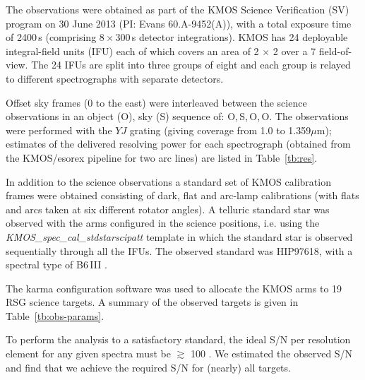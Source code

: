 \documentclass[iop]{emulateapj}
\begin{document}
The observations were obtained as part of the KMOS Science Verification (SV) program on 30 June 2013 (PI: Evans 60.A-9452(A)),
with a total exposure time of 2400\,s
(comprising 8\,$\times$\,300\,s detector integrations).
KMOS has 24 deployable integral-field units (IFU) each of which covers an area of
2 $\times$ 2 over a 7 field-of-view.
The 24 IFUs are split into three groups of eight and each group is relayed to different spectrographs with separate detectors.

Offset sky frames
(0 to the east) were interleaved between the science observations in an object (O), sky (S) sequence of:
O,\,S,\,O,\,O.
The observations were performed with the $YJ$ grating
(giving coverage from 1.0 to 1.359$\mu$m);
estimates of the delivered resolving power for each spectrograph (obtained from the KMOS/esorex pipeline for two arc lines) are listed in Table~\ref{tb:res}.

In addition to the science observations a standard set of KMOS calibration frames were obtained consisting of dark, flat and arc-lamp calibrations (with flats and arcs taken at six different rotator angles).
A telluric standard star was observed with the arms configured in the science positions, i.e. using the {\em KMOS\_spec\_cal\_stdstarscipatt} template in which the standard star is observed sequentially through all the IFUs.
The observed standard was HIP97618, with a spectral type of B6\,III
\citep{1988mcts.book.....H}.

The {\sc karma} configuration software
\citep{2008SPIE.7019E..27W} was used to allocate the KMOS arms to 19 RSG science targets.
A summary of the observed targets is given in
Table~\ref{tb:obs-params}.

To perform the analysis to a satisfactory standard,
the ideal S/N per resolution element for any given spectra must be $\gtrsim$ 100
\citep{2014ApJ...788...58G}.
We estimated the observed S/N and find that we achieve the required S/N for (nearly) all targets.


\end{document}
